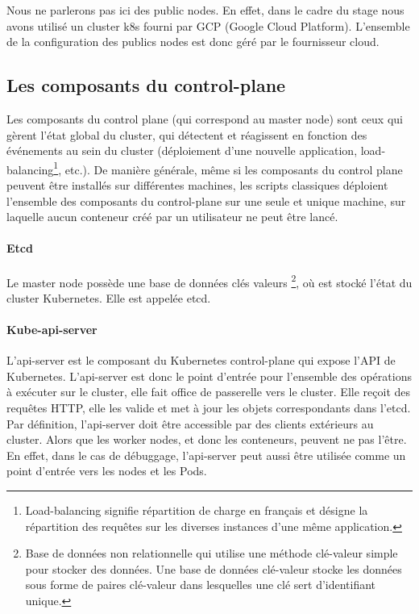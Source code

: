 \documentclass[11pt,fleqn]{book} %
\begin{document}
Nous ne parlerons pas ici des public nodes. En effet, dans le cadre du stage nous avons utilisé un cluster k8s fourni par GCP (Google Cloud Platform). L'ensemble de la configuration des publics nodes est donc géré par le fournisseur cloud.


\subsection*{Les composants du control-plane}
Les composants du control plane (qui correspond au master node) sont ceux qui gèrent l'état global du cluster, qui détectent et réagissent en fonction des événements au sein du cluster (déploiement d'une nouvelle application, load-balancing\footnote{Load-balancing signifie répartition de charge en français et désigne la répartition des requêtes sur les diverses instances d'une même application.}, etc.). De manière générale, même si les composants du control plane peuvent être installés sur différentes machines, les scripts classiques déploient l'ensemble des composants du control-plane sur une seule et unique machine, sur laquelle aucun conteneur créé par un utilisateur ne peut être lancé.

\paragraph*{Etcd}
Le master node possède une base de données clés valeurs \footnote{Base de données non relationnelle qui utilise une méthode clé-valeur simple pour stocker des données. Une base de données clé-valeur stocke les données sous forme de paires clé-valeur dans lesquelles une clé sert d'identifiant unique.}, où est stocké l'état du cluster Kubernetes. Elle est appelée etcd.

\paragraph*{Kube-api-server}
L'api-server est le composant du Kubernetes control-plane qui expose l'API de Kubernetes. L'api-server est donc le point d'entrée pour l'ensemble des opérations à exécuter sur le cluster, elle fait office de passerelle vers le cluster. Elle reçoit des requêtes HTTP, elle les valide et met à jour les objets correspondants dans l'etcd. Par définition, l'api-server doit être accessible par des clients extérieurs au cluster. Alors que les worker nodes, et donc les conteneurs, peuvent ne pas l'être. En effet, dans le cas de débuggage, l'api-server peut aussi être utilisée comme un point d'entrée vers les nodes et les Pods.
\end{document}
